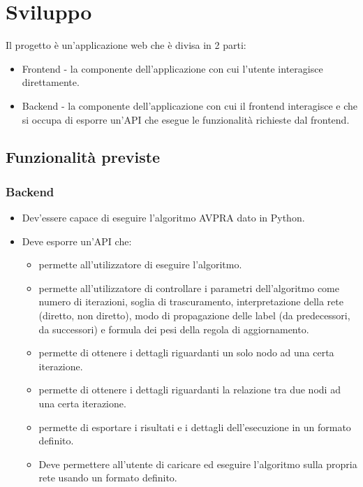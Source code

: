 \documentclass[a4paper,12pt]{report}
\begin{document}
	\section{Sviluppo}
		Il progetto è un'applicazione web che è divisa in 2 parti:
		\begin{itemize}
		\item Frontend - la componente dell'applicazione con cui l'utente interagisce direttamente.
		\item Backend - la componente dell'applicazione con cui il frontend interagisce e che si occupa di esporre un'API che esegue le funzionalità richieste dal frontend.
		\end{itemize}
		
		\subsection{Funzionalità previste}
			\subsubsection{Backend}
			\begin{itemize}
				\item Dev'essere capace di eseguire l'algoritmo AVPRA dato in Python.
				\item Deve esporre un'API che:
				\begin{itemize}
					\item permette all'utilizzatore di eseguire l'algoritmo.
					\item permette all'utilizzatore di controllare i parametri dell'algoritmo come numero di iterazioni, soglia di trascuramento, interpretazione della rete (diretto, non diretto), modo di propagazione delle label (da predecessori, da successori) e formula dei pesi della regola di aggiornamento.
					\item permette di ottenere i dettagli riguardanti un solo nodo ad una certa iterazione.
					\item permette di ottenere i dettagli riguardanti la relazione tra due nodi ad una certa iterazione.
					\item permette di esportare i risultati e i dettagli dell'esecuzione in un formato definito.
					\item Deve permettere all'utente di caricare ed eseguire l'algoritmo sulla propria rete usando un formato definito.
				\end{itemize}
			\end{itemize}
\end{document}
